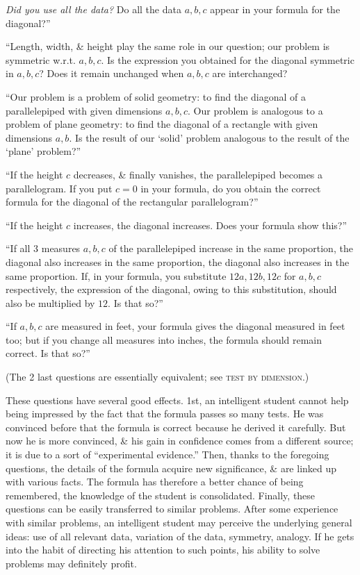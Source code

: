 \documentclass[oneside]{book}
\numberwithin{equation}{section}
\begin{document}
\textit{Did you use all the data?} Do all the data $a,b,c$ appear in your formula for the diagonal?''

``Length, width, \& height play the same role in our question; our problem is symmetric w.r.t. $a,b,c$. Is the expression you obtained for the diagonal symmetric in $a,b,c$? Does it remain unchanged when $a,b,c$ are interchanged?

``Our problem is a problem of solid geometry: to find the diagonal of a parallelepiped with given dimensions $a,b,c$. Our problem is analogous to a problem of plane geometry: to find the diagonal of a rectangle with given dimensions $a,b$. Is the result of our `solid' problem analogous to the result of the `plane' problem?''

``If the height $c$ decreases, \& finally vanishes, the parallelepiped becomes a parallelogram. If you put $c = 0$ in your formula, do you obtain the correct formula for the diagonal of the rectangular parallelogram?''

``If the height $c$ increases, the diagonal increases. Does your formula show this?''

``If all 3 measures $a,b,c$ of the parallelepiped increase in the same proportion, the diagonal also increases in the same proportion, the diagonal also increases in the same proportion. If, in your formula, you substitute $12a,12b,12c$ for $a,b,c$ respectively, the expression of the diagonal, owing to this substitution, should also be multiplied by $12$. Is that so?''

``If $a,b,c$ are measured in feet, your formula gives the diagonal measured in feet too; but if you change all measures into inches, the formula should remain correct. Is that so?''

(The 2 last questions are essentially equivalent; see \textsc{test by dimension}.)

These questions have several good effects. 1st, an intelligent student cannot help being impressed by the fact that the formula passes so many tests. He was convinced before that the formula is correct because he derived it carefully. But now he is more convinced, \& his gain in confidence comes from a different source; it is due to a sort of ``experimental evidence.'' Then, thanks to the foregoing questions, the details of the formula acquire new significance, \& are linked up with various facts. The formula has therefore a better chance of being remembered, the knowledge of the student is consolidated. Finally, these questions can be easily transferred to similar problems. After some experience with similar problems, an intelligent student may perceive the underlying general ideas: use of all relevant data, variation of the data, symmetry, analogy. If he gets into the habit of directing his attention to such points, his ability to solve problems may definitely profit.
\end{document}
